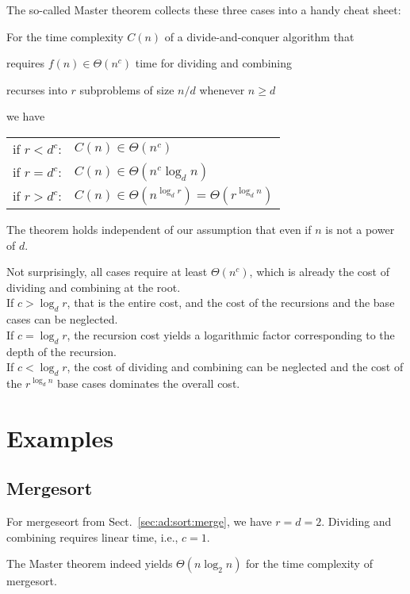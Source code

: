 The so-called Master theorem collects these three cases into a handy cheat sheet:

\begin{theorem}
For the time complexity $C(n)$ of a divide-and-conquer algorithm that
\begin{compactitem}
 \item requires $f(n)\in\Theta(n^c)$ time for dividing and combining
 \item recurses into $r$ subproblems of size $n/d$ whenever $n\geq d$
\end{compactitem}
we have
\begin{center}
\begin{tabular}{ll}
if $r<d^c$: & $C(n)\in\Theta(n^c)$ \\
if $r=d^c$: & $C(n)\in\Theta(n^c\log_d n)$ \\
if $r>d^c$: & $C(n)\in\Theta(n^{\log_d r})=\Theta(r^{\log_d n})$ \\
\end{tabular}
\end{center}
\end{theorem}

The theorem holds independent of our assumption that even if $n$ is not a power of $d$.

Not surprisingly, all cases require at least $\Theta(n^c)$, which is already the cost of dividing and combining at the root.\\
If $c>\log_d r$, that is the entire cost, and the cost of the recursions and the base cases can be neglected.\\
If $c=\log_d r$, the recursion cost yields a logarithmic factor corresponding to the depth of the recursion.\\
If $c<\log_d r$, the cost of dividing and combining can be neglected and the cost of the $r^{\log_d n}$ base cases dominates the overall cost.

\section{Examples}

\subsection{Mergesort}

For mergeseort from Sect.~\ref{sec:ad:sort:merge}, we have $r=d=2$.
Dividing and combining requires linear time, i.e., $c=1$.

The Master theorem indeed yields $\Theta(n\log_2 n)$ for the time complexity of mergesort.

